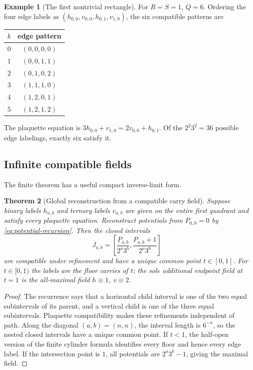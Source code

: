\documentclass[11pt]{article}
\newtheorem{theorem}{Theorem}[section]
\theoremstyle{definition}
\newtheorem{example}[theorem]{Example}
\theoremstyle{remark}
\begin{document}
\begin{example}[The first nontrivial rectangle]\label{ex:one-square}
For $R=S=1$, $Q=6$.  Ordering the four edge labels as
$(h_{0,0},v_{0,0},h_{0,1},v_{1,0})$, the six compatible patterns are
\begin{center}
\begin{tabular}{c@{\qquad}c}
\toprule
$k$ & edge pattern \\
\midrule
$0$ & $(0,0,0,0)$\\
$1$ & $(0,0,1,1)$\\
$2$ & $(0,1,0,2)$\\
$3$ & $(1,1,1,0)$\\
$4$ & $(1,2,0,1)$\\
$5$ & $(1,2,1,2)$\\
\bottomrule
\end{tabular}
\end{center}
The plaquette equation is $3h_{0,0}+v_{1,0}=2v_{0,0}+h_{0,1}$.  Of the
$2^2 3^2=36$ possible edge labelings, exactly six satisfy it.
\end{example}

\subsection{Infinite compatible fields}

The finite theorem has a useful compact inverse-limit form.

\begin{theorem}[Global reconstruction from a compatible carry field]
\label{thm:global-reconstruction}
Suppose binary labels $h_{a,b}$ and ternary labels $v_{a,b}$ are given on the entire
first quadrant and satisfy every plaquette equation.  Reconstruct potentials from
$P_{0,0}=0$ by \eqref{eq:potential-recursion}.  Then the closed intervals
\begin{equation}\label{eq:nested-intervals}
 J_{a,b}=
 \left[\frac{P_{a,b}}{2^a3^b},
       \frac{P_{a,b}+1}{2^a3^b}\right]
\end{equation}
are compatible under refinement and have a unique common point $t\in[0,1]$.
For $t\in[0,1)$ the labels are the floor carries of $t$; the sole additional endpoint
field at $t=1$ is the all-maximal field $h\equiv1$, $v\equiv2$.
\end{theorem}

\begin{proof}
The recurrence says that a horizontal child interval is one of the two equal
subintervals of its parent, and a vertical child is one of the three equal
subintervals.  Plaquette compatibility makes these refinements independent of path.
Along the diagonal $(a,b)=(n,n)$, the interval length is $6^{-n}$, so the nested
closed intervals have a unique common point.  If $t<1$, the half-open version of the
finite cylinder formula identifies every floor and hence every edge label.  If the
intersection point is $1$, all potentials are $2^a3^b-1$, giving the maximal field.
\end{proof}
\end{document}
